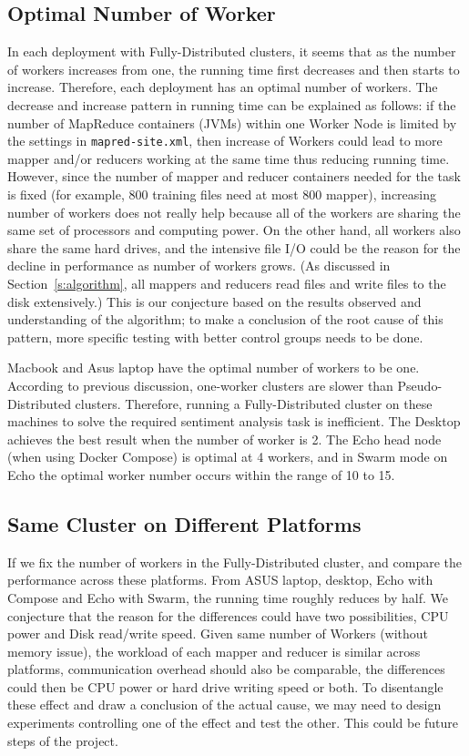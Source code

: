 \subsection{Optimal Number of Worker}
In each deployment with Fully-Distributed clusters, it seems that as
the number of workers increases from one, the running time first
decreases and then starts to increase. Therefore, each deployment has
an optimal number of workers. The decrease and increase pattern in
running time can be explained as follows: if the number of MapReduce
containers (JVMs) within one Worker Node is limited by the settings
in \verb|mapred-site.xml|, then increase of Workers could lead to more
mapper and/or reducers working at the same time thus reducing running
time. However, since the number of mapper and reducer containers
needed for the task is fixed (for example, 800 training files need at
most 800 mapper), increasing number of workers does not really help
because all of the workers are sharing the same set of processors and
computing power. On the other hand, all workers also share the same
hard drives, and the intensive file I/O could be the reason for
the decline in performance as number of workers grows.
(As discussed in Section~\ref{s:algorithm}, all mappers and reducers read
files and write files to the disk extensively.) This is our conjecture
based on the results observed and understanding of the algorithm; to
make a conclusion of the root cause of this pattern, more specific
testing with better control groups needs to be done.

Macbook and Asus laptop have the optimal number of workers to be one.
According to previous discussion, one-worker clusters are slower than
Pseudo-Distributed clusters. Therefore, running a Fully-Distributed
cluster on these machines to solve the required sentiment analysis
task is inefficient.  The Desktop achieves the best result when the
number of worker is 2. The Echo head node (when using Docker Compose)
is optimal at 4 workers, and in Swarm mode on Echo the optimal worker
number occurs within the range of 10 to 15.

\subsection{Same Cluster on Different Platforms}

If we fix the number of workers in the Fully-Distributed cluster, and
compare the performance across these platforms. From ASUS laptop,
desktop, Echo with Compose and Echo with Swarm, the running time
roughly reduces by half. We conjecture that the reason for the
differences could have two possibilities, CPU power and Disk
read/write speed. Given same number of Workers (without memory issue),
the workload of each mapper and reducer is similar across platforms,
communication overhead should also be comparable, the differences
could then be CPU power or hard drive writing speed or both. To
disentangle these effect and draw a conclusion of the actual cause, we
may need to design experiments controlling one of the effect and test
the other. This could be future steps of the project.

